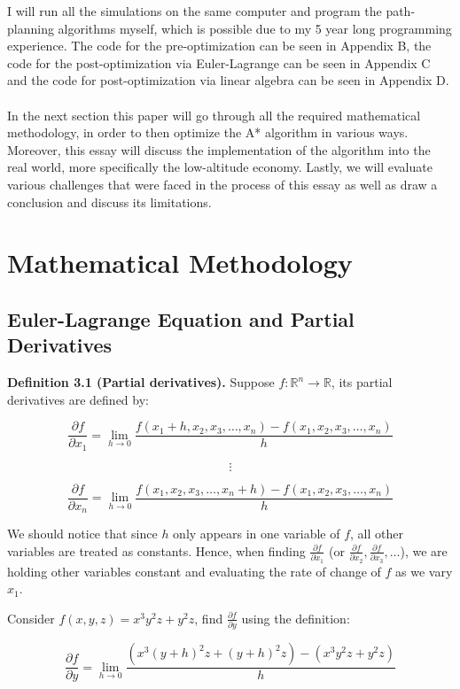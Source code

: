 \documentclass[12pt]{article}
\begin{document}
I will run all the simulations on the same computer and program the path-planning algorithms myself, which is possible due to my 5 year long programming experience. The code for the pre-optimization can be seen in Appendix B, the code for the post-optimization via Euler-Lagrange can be seen in Appendix C and the code for post-optimization via linear algebra can be seen in Appendix D. \\\\
In the next section this paper will go through all the required mathematical methodology, in order to then optimize the A* algorithm in various ways. Moreover, this essay will discuss the implementation of the algorithm into the real world, more specifically the low-altitude economy. Lastly, we will evaluate various challenges that were faced in the process of this essay as well as draw a conclusion and discuss its limitations.

\newpage

\section{Mathematical Methodology}
\subsection{Euler-Lagrange Equation and Partial Derivatives}
\textbf{Definition 3.1 (Partial derivatives).} Suppose \( f : \mathbb{R}^n \to \mathbb{R} \), its partial derivatives are defined by:

\[
\frac{\partial f}{\partial x_1} = \lim_{h \to 0} \frac{f(x_1 + h, x_2, x_3, \ldots, x_n) - f(x_1, x_2, x_3, \ldots, x_n)}{h}
\]

\[
\vdots
\]

\[
\frac{\partial f}{\partial x_n} = \lim_{h \to 0} \frac{f(x_1, x_2, x_3, \ldots, x_n + h) - f(x_1, x_2, x_3, \ldots, x_n)}{h}
\]

We should notice that since \( h \) only appears in one variable of \( f \), all other variables are treated as constants. Hence, when finding \( \frac{\partial f}{\partial x_1} \) (or \( \frac{\partial f}{\partial x_2}, \frac{\partial f}{\partial x_3}, \ldots \)), we are holding other variables constant and evaluating the rate of change of \( f \) as we vary \( x_1 \).

Consider \( f(x, y, z) = x^3 y^2 z + y^2 z \), find \( \frac{\partial f}{\partial y} \) using the definition:

\[
\frac{\partial f}{\partial y} = \lim_{h \to 0} \frac{(x^3(y + h)^2 z + (y + h)^2 z) - (x^3 y^2 z + y^2 z)}{h}
\]
\end{document}
